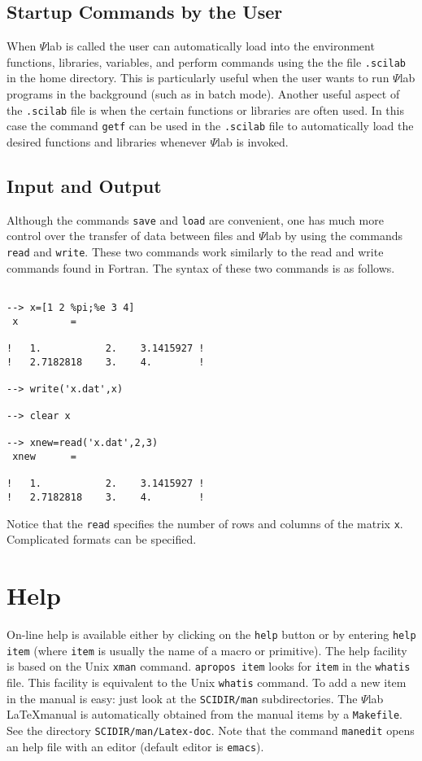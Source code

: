 \subsection{Startup Commands by the User}
\label{s5.2}

	When $\Psi$lab is called the user can automatically load
into the environment functions, libraries, variables, and perform
commands using the the file {\tt .scilab} in the home directory.  
This is particularly useful when the user wants to run $\Psi$lab programs
in the background (such as in batch mode).  Another useful aspect
of the {\tt .scilab} file is when the certain functions or libraries
are often used.  In this case the command {\tt getf} can be used
in the {\tt .scilab} file to automatically load the desired 
functions and libraries whenever $\Psi$lab is invoked.

\subsection{Input and Output}
\label{s5.3}

	Although the commands {\tt save} and {\tt load} are
convenient, one has much more control over the transfer of
data between files and $\Psi$lab by using the commands 
{\tt read}
and {\tt write}.  
These two commands work similarly to the
read and write commands found in Fortran.  The syntax of these
two commands is as follows.  
\begin{verbatim}
 
--> x=[1 2 %pi;%e 3 4]
 x         =
 
!   1.           2.    3.1415927 !
!   2.7182818    3.    4.        !
 
--> write('x.dat',x)
 
--> clear x
 
--> xnew=read('x.dat',2,3)
 xnew      =
 
!   1.           2.    3.1415927 !
!   2.7182818    3.    4.        !
\end{verbatim}
Notice that the {\tt read} specifies the number of rows and columns
of the matrix {\tt x}.
Complicated formats can be specified. 

\section{Help}
On-line help is available either by clicking on the {\tt help}
button or by entering {\tt help item} (where {\tt item} is usually the 
name of a macro or primitive). The help facility is based on the 
Unix {\tt xman} command. {\tt apropos item} looks for {\tt item} 
in the {\tt whatis} file. This facility is equivalent to the Unix 
{\tt whatis} command. To add a new item in the manual is easy: just
look at the {\tt SCIDIR/man} subdirectories.
The $\Psi$lab \LaTeX  manual is automatically obtained from the
manual items by a {\tt Makefile}. 
See the directory {\tt SCIDIR/man/Latex-doc}. Note that the command
{\tt manedit} opens an help file with an editor (default editor
is {\tt emacs}).


